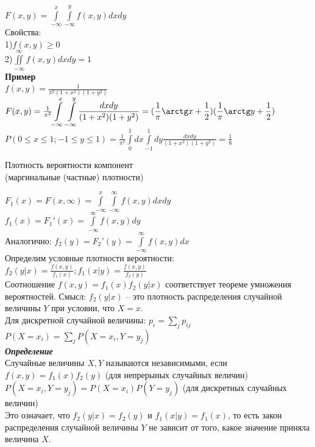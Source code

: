 \documentclass[russian, 12pt, fleqn,x11names]{article}
\begin{document}
$F(x, y) = \displaystyle{\int\limits_{-\infty}^{x} \int\limits_{-\infty}^{y} f(x, y) dx dy}$\\
Свойства:\\
1)$f(x, y) \geq 0$\\
2)$\iint\limits_{-\infty}^{\infty} f(x, y) dxdy = 1$\\
\textbf{Пример} \\
$f(x, y) = \frac{1}{\pi^2(1+x^2)(1+y^2)}$\\
$F(x, y) = \frac{1}{\pi^2} \displaystyle{\int\limits_{-\infty}^{x}  \int\limits_{-\infty}^{y}} \frac{dxdy}{(1+x^2)(1+y^2)} = (\frac{1}{\pi}\arctg x + \frac{1}{2}) (\frac{1}{\pi}\arctg y + \frac{1}{2})$\\
$P(0\leq x \leq 1; -1 \leq y \leq 1) = \frac{1}{\pi^2} \displaystyle{\int\limits_{0}^{1}dx\int\limits_{-1}^{1} dy \frac{dxdy}{(1+x^2)(1+y^2)}} = \frac{1}{8}$
\begin{center}
$\textbf{Плотность вероятности компонент}$\\
(маргинальные (частные) плотности)
\end{center}
$F_1(x) = F(x, \infty)  = \displaystyle{\int\limits_{-\infty}^{x}\int\limits_{-\infty}^{\infty}f(x, y)dxdy}$\\
$f_1(x) = F_1'(x) = \displaystyle{\int \limits_{-\infty}^{\infty}} f(x, y) dy$\\
Аналогично: $f_2(y) = F_2'(y) = \displaystyle{\int \limits_{-\infty}^{\infty}} f(x, y) dx$\\
Определим условные плотности вероятности: $f_2(y|x) = \frac{f(x,y)}{f_1(x)};f_1(x|y) = \frac{f(x,y)}{f_2(y)}$\\
Соотношение $f(x, y) = f_1(x) f_2(y|x)$ соответствует теореме умножения вероятностей. Смысл: $f_2(y|x)$ -- это плотность распределения случайной величины $Y$ при условии, что $X=x$.\\
Для дискретной случайной величины: $p_i = \sum\limits_{j} p_{ij}$\\
$P(X=x_i) =  \sum\limits_{j} P(X=x_i, Y=y_j)$\\
\textit{\textbf{Определение}}\\
Случайные величины $X, Y$ называются независимыми, если $f(x, y) = f_1(x)f_2(y)$ (для непрерыных случайных величин)\\
$ P(X = x_i, Y = y_j) = P(X=x_i) P(Y=y_j)$ (для дискретных случайных  величин)\\
Это означает, что $f_2(y|x) = f_2(y)$ и $f_1(x|y) = f_1(x)$, то есть закон распределения случайной величины $Y$ не зависит от того, какое значение приняла величина $X$.\\
\end{document}
